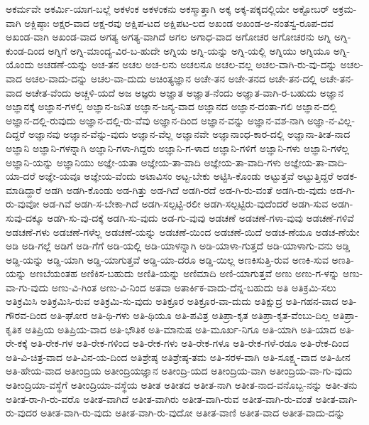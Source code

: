 {ಅಕರ್ಮವೇ
ಅಕರ್ಮಿ-ಯಾಗ-ಬಲ್ಲೆ
ಅಕಳಂಕ
ಅಕಳಂಕನು
ಅಕಸ್ಮಾತ್ತಾಗಿ
ಅಕ್ಕ
ಅಕ್ಕ-ಪಕ್ಕದಲ್ಲಿಯೇ
ಅಕ್ಟೋಬರ್
ಅಕ್ರಮ-ವಾಗಿ
ಅಕ್ಲಿಷ್ಠಾಃ
ಅಕ್ಷರ-ವಾದ
ಅಕ್ಷ-ರವು
ಅಕ್ಷಿಪ-ಟದ
ಅಕ್ಷಿಪಟ-ಲದ
ಅಖಂಡ
ಅಖಂಡ-ಅ-ನಂತಸ್ವ-ರೂಪ-ದವ
ಅಖಂಡ-ವಾಗಿ
ಅಖಂಡ-ವಾದ
ಅಗತ್ಯ
ಅಗತ್ಯ-ವಾಗಿದೆ
ಅಗಲ
ಅಗಾಧ-ವಾದ
ಅಗೋಚರ
ಅಗೋಚರನು
ಅಗ್ನಿ
ಅಗ್ನಿ-ಕುಂಡ-ದಿಂದ
ಅಗ್ನಿಗೆ
ಅಗ್ನಿ-ಮಾಂದ್ಯ-ವಿರ-ಬ-ಹುದೇ
ಅಗ್ನಿಯ
ಅಗ್ನಿ-ಯನ್ನು
ಅಗ್ನಿ-ಯಲ್ಲಿ
ಅಗ್ನಿಯು
ಅಗ್ನಿಯೂ
ಅಗ್ನಿ-ಯೊಂದು
ಅಚಡಣೆ-ಯನ್ನು
ಅಚ-ತನ
ಅಚಲ
ಅಚ-ಲನು
ಅಚಲನೂ
ಅಚಲ-ವಲ್ಲ
ಅಚಲ-ವಾಗಿ-ರು-ವು-ದನ್ನು
ಅಚಲ-ವಾದ
ಅಚಲ-ವಾದು-ದನ್ನು
ಅಚಲ-ವಾ-ದುದು
ಅಚಿಂತ್ಯಜ್ಞಾನ
ಅಚೇ-ತನ
ಅಚೇ-ತನದ
ಅಚೇ-ತನ-ದಲ್ಲಿ
ಅಚೇ-ತನ-ವಾದ
ಅಚೇತ-ವೆಂದು
ಅಚ್ಚಳಿ-ಯದೆ
ಅಜ
ಅಜ್ಞರು
ಅಜ್ಞಾತ
ಅಜ್ಞಾತ-ನೆಂದು
ಅಜ್ಞಾತ-ವಾಗಿ-ರ-ಬಹುದು
ಅಜ್ಞಾನ
ಅಜ್ಞಾನಕ್ಕೆ
ಅಜ್ಞಾನ-ಗಳಲ್ಲಿ
ಅಜ್ಞಾನ-ಜನಿತ
ಅಜ್ಞಾನ-ಜನ್ಯ-ವಾದ
ಅಜ್ಞಾನದ
ಅಜ್ಞಾನ-ದಂತಾ-ಗಲಿ
ಅಜ್ಞಾನ-ದಲ್ಲಿ
ಅಜ್ಞಾನ-ದಲ್ಲಿ-ರುವುದು
ಅಜ್ಞಾನ-ದಲ್ಲಿ-ರು-ವೆವು
ಅಜ್ಞಾನ-ದಿಂದ
ಅಜ್ಞಾನ-ವನ್ನು
ಅಜ್ಞಾನ-ವಶ-ನಾಗಿ
ಅಜ್ಞಾ-ನ-ವಿಲ್ಲ-ದಿದ್ದರೆ
ಅಜ್ಞಾನವು
ಅಜ್ಞಾನ-ವೆನ್ನು-ವುದು
ಅಜ್ಞಾನ-ವೆಲ್ಲ
ಅಜ್ಞಾನವೇ
ಅಜ್ಞಾನಾಂಧ-ಕಾರ-ದಲ್ಲಿ
ಅಜ್ಞಾನಾ-ತೀತ-ನಾದ
ಅಜ್ಞಾನಿ
ಅಜ್ಞಾನಿ-ಗಳನ್ನಾಗಿ
ಅಜ್ಞಾನಿ-ಗಳಾ-ಗಿದ್ದರು
ಅಜ್ಞಾನಿ-ಗ-ಳಾದ
ಅಜ್ಞಾನಿ-ಗಳಿಗೆ
ಅಜ್ಞಾನಿ-ಗಳು
ಅಜ್ಞಾನಿ-ಗಳೆಲ್ಲ
ಅಜ್ಞಾನಿ-ಯನ್ನು
ಅಜ್ಞಾನಿಯು
ಅಜ್ಞೇ-ಯತಾ
ಅಜ್ಞೇಯ-ತಾ-ವಾದಿ
ಅಜ್ಞೇಯ-ತಾ-ವಾದಿ-ಗಳು
ಅಜ್ಞೇಯ-ತಾ-ವಾದಿ-ಯಾ-ದರೆ
ಅಜ್ಞೇ-ಯವೂ
ಅಜ್ಞೇಯ-ವೆಂದು
ಅಟಾವಿಸಂ
ಅಟ್ಟ-ಬೇಕು
ಅಟ್ಟಿಸಿ-ಕೊಂಡು
ಅಟ್ಟುತ್ತವೆ
ಅಟ್ಟುತ್ತಿದ್ದರೆ
ಅಡಕ-ಮಾಡಿದ್ದಾರೆ
ಅಡಗಿ
ಅಡಗಿ-ಕೊಂಡು
ಅಡ-ಗಿತ್ತು
ಅಡ-ಗಿದೆ
ಅಡಗಿ-ರದೆ
ಅಡ-ಗಿ-ರು-ವಂತೆ
ಅಡಗಿ-ರು-ವುದು
ಅಡ-ಗಿ-ರು-ವುವೋ
ಅಡ-ಗಿವೆ
ಅಡಗಿ-ಸ-ಬೇಕಾ-ಗಿದೆ
ಅಡಗಿ-ಸಲ್ಪಟ್ಟಿ-ರಲೀ
ಅಡಗಿ-ಸಲ್ಪಟ್ಟಿರು-ವುದೆಂದರೆ
ಅಡಗಿ-ಸುವ
ಅಡಗಿ-ಸುವು-ದಕ್ಕೂ
ಅಡಗಿ-ಸು-ವು-ದಕ್ಕೆ
ಅಡಗಿ-ಸು-ವುದು
ಅಡ-ಗು-ವುವು
ಅಡಚಣೆ
ಅಡಚಣೆ-ಗಳಾ-ವುವು
ಅಡಚಣೆ-ಗಳಿವೆ
ಅಡಚಣೆ-ಗಳು
ಅಡಚಣೆ-ಗಳೆಲ್ಲ
ಅಡಚಣೆ-ಯನ್ನು
ಅಡಚಣೆ-ಯಿಂದ
ಅಡಚಣೆ-ಯಿದೆ
ಅಡಚ-ಣೆಯೂ
ಅಡಚ-ಣೆಯೇ
ಅಡಿ
ಅಡಿ-ಗಲ್ಲೆ
ಅಡಿಗೆ
ಅಡಿ-ಗೆಗೆ
ಅಡಿ-ಯಲ್ಲಿ
ಅಡಿ-ಯಾಳನ್ನಾಗಿ
ಅಡಿ-ಯಾಳಾ-ಗುತ್ತದೆ
ಅಡಿ-ಯಾಳಾಗು-ವನು
ಅಡ್ಡಿ
ಅಡ್ಡಿ-ಯನ್ನು
ಅಡ್ಡಿ-ಯಾಗಿ
ಅಡ್ಡಿ-ಯಾಗುತ್ತವೆ
ಅಡ್ಡಿ-ಯಾ-ದರೂ
ಅಡ್ಡಿ-ಯಿಲ್ಲ
ಅಣಕಿಸುತ್ತಿ-ರುವ
ಅಣಕಿ-ಸುವ
ಅಣತಿ-ಯನ್ನು
ಅಣಬೆಯಂತಹ
ಅಣಿಕಿಸ-ಬಹುದು
ಅಣಿತಿ-ಯನ್ನು
ಅಣಿಮಾದಿ
ಅಣಿ-ಯಾಗುತ್ತವೆ
ಅಣು
ಅಣು-ಗ-ಳನ್ನು
ಅಣು-ವಾ-ಗು-ವುದು
ಅಣು-ವಿ-ಗಿಂತ
ಅಣು-ವಿ-ನಿಂದ
ಅತವಾ
ಅತಾರ್ಕಿಕ-ವಾದು-ದೆನ್ನ-ಬಹುದು
ಅತಿ
ಅತಿಕ್ರಮಿ-ಸಲು
ಅತಿಕ್ರಮಿಸಿ
ಅತಿಕ್ರಮಿಸಿ-ರುವ
ಅತಿಕ್ರಮಿ-ಸು-ವುದು
ಅತಿಕ್ರೂರ
ಅತಿಕ್ರೂರ-ವಾ-ದುದು
ಅತಿಕ್ಷುದ್ರ
ಅತಿ-ಗಹನ-ವಾದ
ಅತಿ-ಗೌರವ-ದಿಂದ
ಅತಿ-ಘೋರ
ಅತಿ-ಥಿ-ಗಳು
ಅತಿ-ಥಿಯೂ
ಅತಿ-ಪವಿತ್ರ
ಅತಿಪ್ರಾ-ಕೃತ
ಅತಿಪ್ರಾ-ಕೃತ-ವೆಂಬು-ದಿಲ್ಲ
ಅತಿಪ್ರಾ-ಕೃತಿಕ
ಅತಿಪ್ರಿಯ
ಅತಿಪ್ರಿಯ-ವಾದ
ಅತಿ-ಭೌತಿಕ
ಅತಿ-ಮಾನುಷ
ಅತಿ-ಮೂರ್ಖ-ನಿಗೂ
ಅತಿ-ಯಾಗಿ
ಅತಿ-ಯಾದ
ಅತಿ-ರೇ-ಕಕ್ಕೆ
ಅತಿ-ರೇಕ-ಗಳ
ಅತಿ-ರೇಕ-ಗಳಿಂದ
ಅತಿ-ರೇಕ-ಗಳು
ಅತಿ-ರೇಕ-ಗಳೂ
ಅತಿ-ರೇಕ-ಗಳೆ-ರಡೂ
ಅತಿ-ರೇಕ-ದಿಂದ
ಅತಿ-ವಿ-ಚಿತ್ರ-ವಾದ
ಅತಿ-ವಿನ-ಯ-ದಿಂದ
ಅತಿಶ್ರೇಷ್ಠ
ಅತಿಶ್ರೇಷ್ಠ-ತಮ
ಅತಿ-ಸರಳ-ವಾಗಿ
ಅತಿ-ಸೂಕ್ಷ್ಮ-ವಾದ
ಅತಿ-ಹೀನ
ಅತಿ-ಹೇಯ-ವಾದ
ಅತೀಂದ್ರಿಯ
ಅತೀಂದ್ರಿಯಜ್ಞಾನ
ಅತೀಂದ್ರಿ-ಯದ
ಅತೀಂದ್ರಿಯ-ವಾಗಿ
ಅತೀಂದ್ರಿಯ-ವಾ-ಗು-ವುದು
ಅತೀಂದ್ರಿಯಾ-ವಸ್ಥೆಗೆ
ಅತೀಂದ್ರಿಯಾ-ವಸ್ಥೆಯ
ಅತೀತ
ಅತೀತದ
ಅತೀತ-ನಾಗಿ
ಅತೀತ-ನಾದ-ವನೊಬ್ಬ-ನನ್ನು
ಅತೀ-ತನು
ಅತೀತ-ರಾ-ಗಿ-ರು-ವರೊ
ಅತೀತ-ವಾಗಿದೆ
ಅತೀತ-ವಾಗಿರು
ಅತೀತ-ವಾಗಿ-ರುವ
ಅತೀತ-ವಾಗಿ-ರು-ವಂತೆ
ಅತೀತ-ವಾಗಿ-ರು-ವುದರ
ಅತೀತ-ವಾಗಿ-ರು-ವುದು
ಅತೀತ-ವಾಗಿ-ರು-ವುದೋ
ಅತೀತ-ವಾಣಿ
ಅತೀತ-ವಾದ
ಅತೀತ-ವಾದು-ದನ್ನು
}
